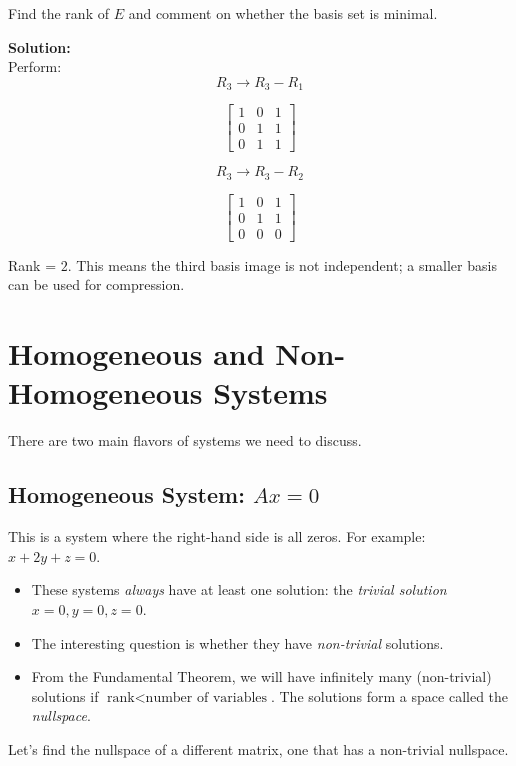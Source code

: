 \documentclass[
  letterpaper,
  DIV=11,
  numbers=noendperiod]{scrreprt}
\providecommand{\tightlist}{%
  \setlength{\itemsep}{0pt}\setlength{\parskip}{0pt}}
\begin{document}
Find the rank of \(E\) and comment on whether the basis set is minimal.

\textbf{Solution:}\\
Perform: \[
R_3 \to R_3 - R_1
\]

\[
\begin{bmatrix}
1 & 0 & 1 \\
0 & 1 & 1 \\
0 & 1 & 1
\end{bmatrix}
\]

\[
R_3 \to R_3 - R_2
\]

\[
\begin{bmatrix}
1 & 0 & 1 \\
0 & 1 & 1 \\
0 & 0 & 0
\end{bmatrix}
\]

Rank = \(2\). This means the third basis image is not independent; a
smaller basis can be used for compression.

\section{Homogeneous and Non-Homogeneous
Systems}\label{homogeneous-and-non-homogeneous-systems}

There are two main flavors of systems we need to discuss.

\subsection{\texorpdfstring{Homogeneous System:
\(Ax = 0\)}{Homogeneous System: Ax = 0}}\label{homogeneous-system-ax-0}

This is a system where the right-hand side is all zeros. For example:
\(x + 2y + z = 0\).

\begin{itemize}
\tightlist
\item
  These systems \emph{always} have at least one solution: the
  \emph{trivial solution} \(x=0, y=0, z=0\).
\item
  The interesting question is whether they have \emph{non-trivial}
  solutions.
\item
  From the Fundamental Theorem, we will have infinitely many
  (non-trivial) solutions if
  \(\text{rank} < \text{number of variables}\). The solutions form a
  space called the \emph{nullspace}.
\end{itemize}

Let's find the nullspace of a different matrix, one that has a
non-trivial nullspace.
\end{document}
